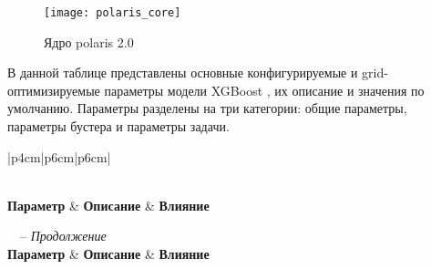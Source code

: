 \documentclass[14pt, a4paper]{src/bsu}
\begin{document}
\begin{figure}[htbp] \centering
	\texttt{[image: polaris\_core]} \caption{Ядро polaris 2.0}
	\label{fig:polaris_core} \end{figure}

В данной таблице представлены основные конфигурируемые и grid-оптимизируемые
параметры модели XGBoost \cite{xgboost_parameters_docs}, их описание и значения
по умолчанию. Параметры разделены на три категории: общие параметры, параметры
бустера и параметры задачи.

\begin{longtable}{|p{4cm}|p{6cm}|p{6cm}|} \caption{Параметры XGBoost и их
		влияние}\label{tab:xgboost_params}
	\\

	\hline \textbf{Параметр}                          & \textbf{Описание}
	                                                  & \textbf{Влияние}
	\\ \hline \endfirsthead

	 {\tablename\ \thetable\ -- \textit{Продолжение}}
	\\ \hline \textbf{Параметр}             & \textbf{Описание}
	                                                  & \textbf{Влияние}
	\\ \hline \endhead

	\hline {}
	\\ \hline \endfoot

	\hline \endlastfoot


\end{longtable}
\end{document}
